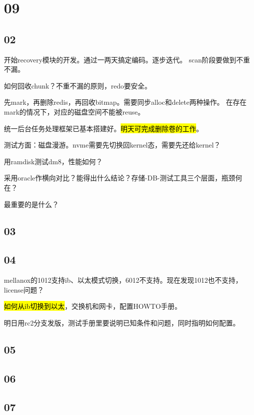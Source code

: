 \section{09}

\subsection{02}

开始recovery模块的开发。通过一两天搞定编码。逐步迭代。
scan阶段要做到不重不漏。

如何回收chunk？不重不漏的原则，redo要安全。

先mark，再删除redis，再回收bitmap。需要同步alloc和delete两种操作。
在存在mark的情况下，对应的磁盘空间不能被reuse。

统一后台任务处理框架已基本搭建好。\hl{明天可完成删除卷的工作}。

测试方面：磁盘漫游。nvme需要先切换回kernel态，需要先还给kernel？

用ramdisk测试dm8，性能如何？

采用oracle作横向对比？能得出什么结论？存储-DB-测试工具三个层面，瓶颈何在？

最重要的是什么？

\subsection{03}

\subsection{04}

mellanox的1012支持ib、以太模式切换，6012不支持。现在发现1012也不支持，license问题？

\hl{如何从ib切换到以太}，交换机和网卡，配置HOWTO手册。

明日用rc2分支发版，测试手册里要说明已知条件和问题，同时指明如何配置。

\subsection{05}

\subsection{06}

\subsection{07}

